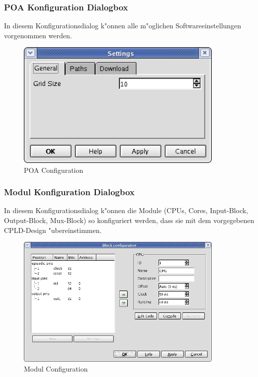 \documentclass[a4paper,titlepage,12pt,ngerman]{scrbook}
\begin{document}
\subsubsection{POA Konfiguration Dialogbox}
In diesem Konfigurationsdialog k"onnen alle m"oglichen Softwareeinstellungen vorgenommen werden.
\begin{figure}[htbp]
\begin{center}
\includegraphics[width=10cm]{POAConfiguration1}
\caption{POA Configuration}\label{test}
\end{center}
\end{figure}

\subsubsection{Modul Konfiguration Dialogbox}
In diesem Konfigurationsdialog k"onnen die Module (CPUs, Cores, Input-Block,
Output-Block, Mux-Block) so konfiguriert werden, dass sie mit dem vorgegebenen
CPLD-Design "ubereinstimmen.
\begin{figure}[htbp]
\begin{center}
\includegraphics[width=10cm]{CPUConfiguration}
\caption{Modul Configuration}\label{test}
\end{center}
\end{figure}
\end{document}
